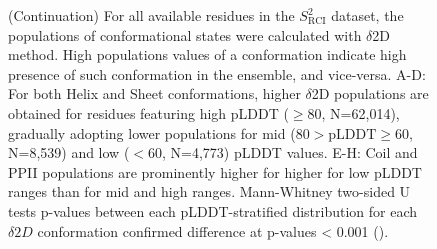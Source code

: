 \begin{figure}[H]
  \ContinuedFloat
  \caption[]{(Continuation) For all available residues in the $S^{2}_{\text{RCI}}$ dataset, the populations of conformational states were calculated with $\delta$2D method. High populations values of a conformation indicate high presence of such conformation in the ensemble, and vice-versa. A-D: For both Helix and Sheet conformations, higher $\delta$2D populations are obtained for residues featuring high pLDDT  (\( \geq 80 \), N=62,014), gradually adopting lower populations for mid (\( 80 > \text{pLDDT} \geq 60 \), N=8,539) and low (\( < 60 \), N=4,773) pLDDT values. E-H: Coil and PPII populations are prominently higher for higher for low pLDDT ranges than for mid and high ranges. 
    Mann-Whitney two-sided U tests p-values between each pLDDT-stratified distribution for each $\delta 2D$ conformation confirmed difference at p-values < 0.001 ().}
\end{figure}


